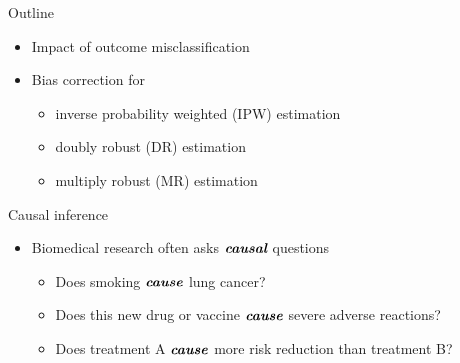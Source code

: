\documentclass[12pt,aspectratio=169]{beamer}
\begin{document}
\begin{frame}{Outline}
 	\begin{itemize}
 	
\item Impact of outcome misclassification

\item Bias correction for 

\begin{itemize}
 	
\item inverse probability weighted (IPW) estimation


\item doubly robust (DR) estimation


\item multiply robust (MR) estimation

\end{itemize}

\end{itemize}
\end{frame}


\begin{frame}{Causal inference}
 	\begin{itemize}
\item Biomedical research often asks ${\textbf{\em causal}}$ questions
\begin{itemize}
\item Does smoking ${\textbf{\em cause}}$ lung cancer?
\item Does this new drug or vaccine ${\textbf{\em cause}}$ severe adverse reactions?
\item Does treatment A ${\textbf{\em cause}}$ more risk reduction than treatment B?

\end{itemize}
\end{itemize}
\end{frame}
\end{document}
